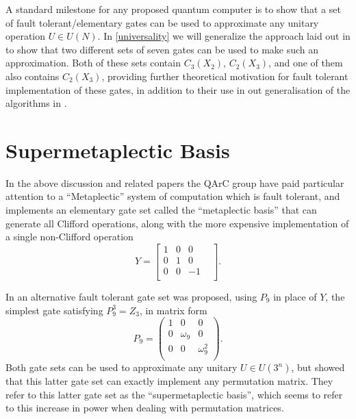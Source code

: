 A standard milestone for any proposed quantum computer is to show that a set of fault tolerant/elementary gates can be used to approximate any unitary operation $U \in U(N)$. In \autoref{universality} we will generalize the approach laid out in \cite{universal-qubit} to show that two different sets of seven gates can be used to make such an approximation. Both of these sets contain $C_3(X_2)$, $C_2(X_3)$, and one of them also contains $C_2(X_3)$, providing further theoretical motivation for fault tolerant implementation of these gates, in addition to their use in out generalisation of the algorithms in \cite{arithmetics}.

\section{Supermetaplectic Basis}\label{supermetaplectic}
In the above discussion and related papers the QArC group have paid particular attention to a ``Metaplectic'' system of computation which is fault tolerant, and implements an elementary gate set called the ``metaplectic basis'' that can generate all Clifford operations, along with the more expensive implementation of a single non-Clifford operation
\[Y = \begin{bmatrix}
1 & 0 & 0 & \\
0 & 1 & 0 & \\
0 & 0 & -1 & \\
\end{bmatrix}.\]

In \cite{arithmetics} an alternative fault tolerant gate set was proposed, using $P_9$ in place of $Y$, the simplest gate satisfying $P_9^3 = Z_3$, in matrix form
\[P_9 = \begin{pmatrix}
1 & 0 & 0 \\
0 & \omega_9 & 0 \\
0 & 0 & \omega_9^2 \\
\end{pmatrix}.\]
Both gate sets can be used to approximate any unitary $U \in U(3^n)$, but \cite{arithmetics} showed that this latter gate set can exactly implement any permutation matrix. They refer to this latter gate set as the ``supermetaplectic basis'', which seems to refer to this increase in power when dealing with permutation matrices.

